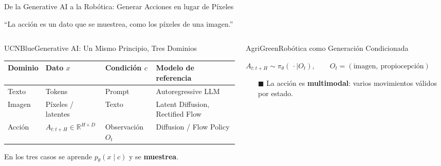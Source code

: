 \documentclass[aspectratio=169,10pt,xcolor={dvipsnames,table}]{beamer}
\newcommand{\BannerFont}{\fontsize{7.5}{9.2}\selectfont\bfseries}       %
\newcommand{\BannerArc}{1.5pt}             %
\newcommand{\BannerRule}{0.5pt}            %
\newcommand{\BannerLeftRule}{2.5pt}        %
\newcommand{\BannerCentral}[2][UCNCyan]{%
  \begin{tcolorbox}[
    enhanced,
    colback=#1!10,
    colframe=#1,
    boxrule=\BannerRule,
    leftrule=\BannerLeftRule,
    arc=\BannerArc,
    top=0.35mm, bottom=0.35mm, left=2mm, right=2mm
  ]
    {\BannerFont\raggedright\textcolor{UCNBlue}{#2}\par}
  \end{tcolorbox}%
  \vspace{-2.5mm}%
}
\newcommand{\BannerRef}[1]{{\mdseries\fontsize{5}{6}\selectfont\textcolor{TextDark!65}{\cite{#1}}}} %
\newcommand{\NoteFont}{\fontsize{5.6}{6.9}\selectfont}                  %
\begin{document}
\begin{frame}{De la Generative AI a la Robótica: Generar Acciones en lugar de Píxeles}
  \BannerCentral[UCNCyan]{``La acción es un dato que se muestrea, como los píxeles de una imagen.'' \BannerRef{rombach2022ldm,esser2024sd3,fang2025flowpolicy}}
  \vspace{0.8mm}
  \begin{columns}[T, onlytextwidth]
    \begin{column}{0.485\textwidth}
      \begin{Card}[height=24mm]{UCNBlue}{Generative AI: Un Mismo Principio, Tres Dominios}
        {\NoteFont
        \setlength{\tabcolsep}{2.2pt}
        \begin{tabular}{@{}l l l l@{}}
          \toprule
          \textbf{Dominio} & \textbf{Dato $x$} & \textbf{Condición $c$} & \textbf{Modelo de referencia} \\
          \midrule
          Texto & Tokens & Prompt & Autoregressive LLM \\
          Imagen & Píxeles / latentes & Texto & Latent Diffusion, Rectified Flow \\
          \rowcolor{AgriGreenLight} Acción & $A_{t:t+H} \in \mathbb{R}^{H \times D}$ & Observación $O_t$ & Diffusion / Flow Policy \\
          \bottomrule
        \end{tabular}\par
        \vspace{0.4mm}
        En los tres casos se aprende $p_\theta(x \mid c)$ y se \textbf{muestrea}.\par}
      \end{Card}
    \end{column}
    \begin{column}{0.485\textwidth}
      \begin{Card}[height=24mm]{AgriGreen}{Robótica como Generación Condicionada}
        {\NoteFont
        \centering $A_{t:t+H} \sim \pi_\theta(\,\cdot \mid O_t), \qquad O_t = (\text{imagen},\ \text{propiocepción})$\par
        \raggedright
        \vspace{0.6mm}
        \begin{itemize}\setlength{\itemsep}{0.6pt}
          \item[\textcolor{AgriGreen}{$\blacksquare$}] La acción es \textbf{multimodal}: varios movimientos válidos por estado.

\end{itemize}}
\end{Card}
\end{column}
\end{columns}
\end{frame}
\end{document}
